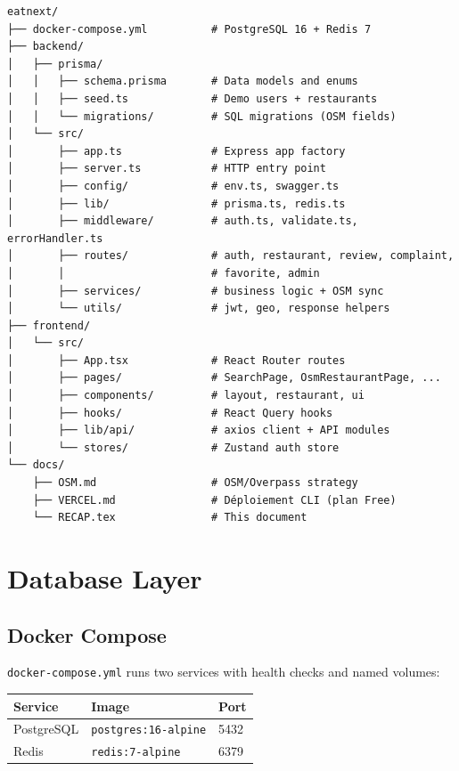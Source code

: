 \documentclass[11pt,a4paper]{article}
\begin{document}
\begin{verbatim}
eatnext/
├── docker-compose.yml          # PostgreSQL 16 + Redis 7
├── backend/
│   ├── prisma/
│   │   ├── schema.prisma       # Data models and enums
│   │   ├── seed.ts             # Demo users + restaurants
│   │   └── migrations/         # SQL migrations (OSM fields)
│   └── src/
│       ├── app.ts              # Express app factory
│       ├── server.ts           # HTTP entry point
│       ├── config/             # env.ts, swagger.ts
│       ├── lib/                # prisma.ts, redis.ts
│       ├── middleware/         # auth.ts, validate.ts, errorHandler.ts
│       ├── routes/             # auth, restaurant, review, complaint,
│       │                       # favorite, admin
│       ├── services/           # business logic + OSM sync
│       └── utils/              # jwt, geo, response helpers
├── frontend/
│   └── src/
│       ├── App.tsx             # React Router routes
│       ├── pages/              # SearchPage, OsmRestaurantPage, ...
│       ├── components/         # layout, restaurant, ui
│       ├── hooks/              # React Query hooks
│       ├── lib/api/            # axios client + API modules
│       └── stores/             # Zustand auth store
└── docs/
    ├── OSM.md                  # OSM/Overpass strategy
    ├── VERCEL.md               # Déploiement CLI (plan Free)
    └── RECAP.tex               # This document
\end{verbatim}

\section{Database Layer}

\subsection{Docker Compose}

\texttt{docker-compose.yml} runs two services with health checks and named volumes:

\begin{tabular}{@{}lll@{}}
\toprule
\textbf{Service} & \textbf{Image} & \textbf{Port} \\
\midrule
PostgreSQL & \texttt{postgres:16-alpine} & 5432 \\
Redis & \texttt{redis:7-alpine} & 6379 \\
\bottomrule
\end{tabular}
\end{document}
